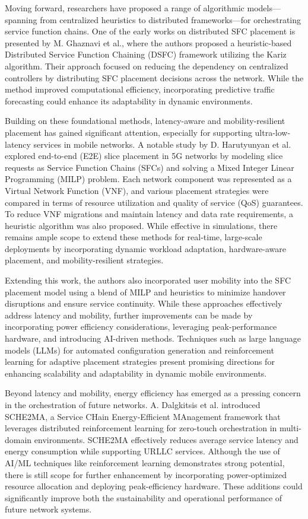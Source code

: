 \documentclass[conference]{IEEEtran}
\begin{document}
	Moving forward, researchers have proposed a range of algorithmic models—spanning from centralized heuristics to distributed frameworks—for orchestrating service function chains. One of the early works on distributed SFC placement is presented by M. Ghaznavi et al., where the authors proposed a heuristic-based Distributed Service Function Chaining (DSFC) framework utilizing the Kariz algorithm. Their approach focused on reducing the dependency on centralized controllers by distributing SFC placement decisions across the network. While the method improved computational efficiency, incorporating predictive traffic forecasting could enhance its adaptability in dynamic environments.
	
	Building on these foundational methods, latency-aware and mobility-resilient placement has gained significant attention, especially for supporting ultra-low-latency services in mobile networks. A notable study by D. Harutyunyan et al. explored end-to-end (E2E) slice placement in 5G networks by modeling slice requests as Service Function Chains (SFCs) and solving a Mixed Integer Linear Programming (MILP) problem. Each network component was represented as a Virtual Network Function (VNF), and various placement strategies were compared in terms of resource utilization and quality of service (QoS) guarantees. To reduce VNF migrations and maintain latency and data rate requirements, a heuristic algorithm was also proposed. While effective in simulations, there remains ample scope to extend these methods for real-time, large-scale deployments by incorporating dynamic workload adaptation, hardware-aware placement, and mobility-resilient strategies.
	
	Extending this work, the authors also incorporated user mobility into the SFC placement model using a blend of MILP and heuristics to minimize handover disruptions and ensure service continuity. While these approaches effectively address latency and mobility, further improvements can be made by incorporating power efficiency considerations, leveraging peak-performance hardware, and introducing AI-driven methods. Techniques such as large language models (LLMs) for automated configuration generation and reinforcement learning for adaptive placement strategies present promising directions for enhancing scalability and adaptability in dynamic mobile environments.
	
	Beyond latency and mobility, energy efficiency has emerged as a pressing concern in the orchestration of future networks. A. Dalgkitsis et al. introduced SCHE2MA, a Service CHain Energy-Efficient MAnagement framework that leverages distributed reinforcement learning for zero-touch orchestration in multi-domain environments. SCHE2MA effectively reduces average service latency and energy consumption while supporting URLLC services. Although the use of AI/ML techniques like reinforcement learning demonstrates strong potential, there is still scope for further enhancement by incorporating power-optimized resource allocation and deploying peak-efficiency hardware. These additions could significantly improve both the sustainability and operational performance of future network systems.
	
\end{document}
